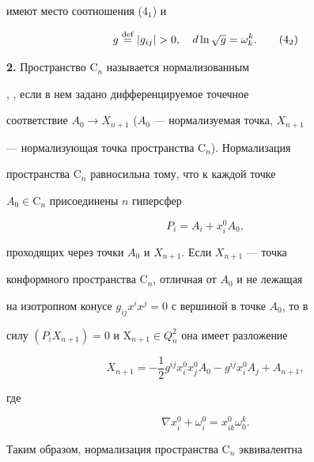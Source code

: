 имеют место соотношения ($4_1$) и 


\begin{equation} 


g\defeq |g_{i j}|>0,\quad d\ln\sqrt{g}=\omega^k_k.\tag{4$_2$} 


\end{equation} 


\addtocounter{equation}{1} 


 


{\bf 2.} Пространство $\mathrm C_n$ называется нормализованным 


\cite{4}, \cite{5}, если в нем задано дифференцируемое точечное 


соответствие $A_0\to X_{n+1}$ ($A_0$ --- нормализуемая точка, $X_{n+1}$ 


--- нормализующая точка пространства $\mathrm C_n$). Нормализация 


пространства $\mathrm C_n$ равносильна тому, что к каждой точке 


$A_0\in\mathrm C_n$ присоединены $n$ гиперсфер 


\begin{equation} 


P_i=A_i+x^0_i A_0, 


\end{equation} 


проходящих через точки $A_0$ и $X_{n+1}$. Если $X_{n+1}$ --- точка 


конформного пространства $\mathrm C_n$, отличная от $A_0$ и не лежащая 


на изотропном конусе $g_{i j}x^i x^j=0$ с вершиной в точке $A_0$, то в 


силу $(P_i X_{n+1}){=}0$ и $\mathrm X_{n+1}\in Q^2_n$ она имеет разложение 


\begin{equation} 


X_{n+1}=-\frac{1}{2}g^{ i j}x^0_i x^0_j A_0-g^{i j} 


x^0_i A_j+A_{n+1}, 


\end{equation} 


где 


\begin{equation} 


\nabla x^0_i+\omega^0_i=x^0_{i k}\omega^k_0. 


\end{equation} 


Таким образом, нормализация пространства $\mathrm C_n$ эквивалентна 


